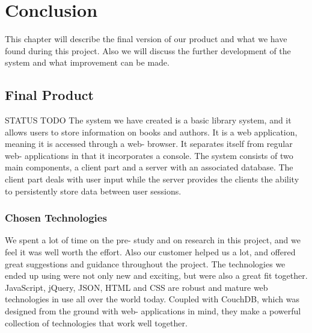 
\chapter{Conclusion}

\minitoc

This chapter will describe the final version of our product and what we have found during this project. Also we will discuss the further development of the system and what improvement can be made.

\clearpage

\section{Final Product}
STATUS
TODO
The system we have created is a basic library system, and it allows users to store information on books and authors. It is a web application, meaning it is accessed through a web- browser. It separates itself from regular web- applications in that it incorporates a console. The system consists of two main components, a client part and a server with an associated database. The client part deals with user input while the server provides the clients the ability to persistently store data between user sessions.

\subsection{Chosen Technologies}
We spent a lot of time on the pre- study and on research in this project, and we feel it was well worth the effort. Also our customer helped us a lot, and offered great suggestions and guidance throughout the project. The technologies we ended up using were not only new and exciting, but were also a great fit together. JavaScript, jQuery, JSON, HTML and CSS are robust and mature web technologies in use all over the world today. Coupled with CouchDB, which was designed from the ground with web- applications in mind, they make a powerful collection of technologies that work well together.


